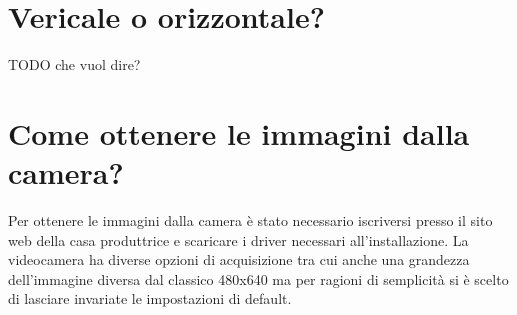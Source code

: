 \section{Vericale o orizzontale?}
TODO che vuol dire?
\section{Come ottenere le immagini dalla camera?}
Per ottenere le immagini dalla camera è stato necessario iscriversi presso il sito web della casa produttrice e scaricare i driver necessari all'installazione.
La videocamera ha diverse opzioni di acquisizione tra cui anche una grandezza dell'immagine diversa dal classico 480x640 ma per ragioni di semplicità si è scelto di lasciare invariate le impostazioni di default.




